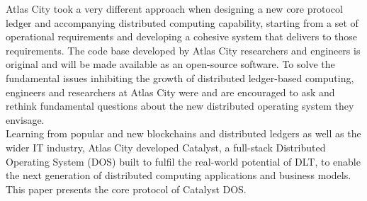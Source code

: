 Atlas City took a very different approach when designing a new core protocol ledger and accompanying distributed computing capability, starting from a set of operational requirements and developing a cohesive system that delivers to those requirements. The code base developed by Atlas City researchers and engineers is original and will be made available as an open-source software. To solve the fundamental issues inhibiting the growth of distributed ledger-based computing, engineers and researchers at Atlas City were and are encouraged to ask and rethink fundamental questions about the new distributed operating system they envisage.\\

Learning from popular and new blockchains and distributed ledgers as well as the wider IT industry, Atlas City developed Catalyst, a full-stack Distributed Operating System (DOS) built to fulfil the real-world potential of DLT, to enable the next generation of distributed computing applications and business models. This paper presents the core protocol of Catalyst DOS. 

